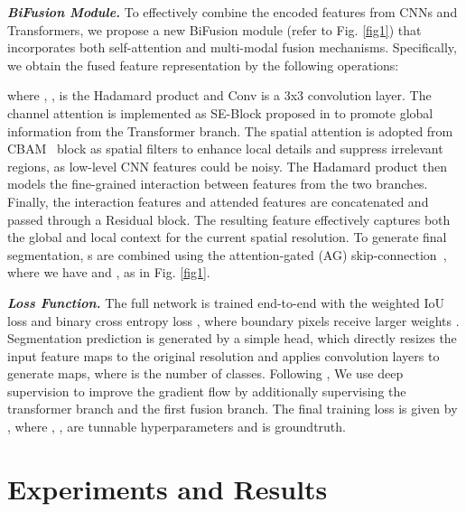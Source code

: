\documentclass[runningheads]{llncs}
\begin{document}
\textit{\textbf{BiFusion Module.}}
To effectively combine the encoded features from CNNs and Transformers, we propose a new BiFusion module (refer to Fig. \ref{fig1}) that incorporates both self-attention and multi-modal fusion mechanisms. Specifically, we obtain the fused feature representation  by the following operations:

where , ,  is the Hadamard product and Conv is a 3x3 convolution layer. The channel attention is implemented as SE-Block proposed in \cite{hu2018squeeze} to promote global information from the Transformer branch. The spatial attention is adopted from CBAM~\cite{woo2018cbam} block as spatial filters to enhance local details and suppress irrelevant regions, as low-level CNN features could be noisy. The Hadamard product then models the fine-grained interaction between features from the two branches. Finally, the interaction features  and attended features  are concatenated and passed through a Residual block. The resulting feature  effectively captures both the global and local context for the current spatial resolution. To generate final segmentation, s are combined using the attention-gated (AG) skip-connection~\cite{schlemper2019attention}, where we have  and , as in Fig. \ref{fig1}.


\textit{\textbf{Loss Function.}}
The full network is trained end-to-end with the weighted IoU loss and binary cross entropy loss , where boundary pixels receive larger weights \cite{qin2019basnet}. Segmentation prediction is generated by a simple head, which directly resizes the input feature maps to the original resolution and applies convolution layers to generate  maps, where  is the number of classes. Following \cite{fan2020pranet}, We use deep supervision to improve the gradient flow by additionally supervising the transformer branch and the first fusion branch. The final training loss is given by , where , ,   are tunnable hyperparameters and  is groundtruth. 
\section{Experiments and Results}
\end{document}
